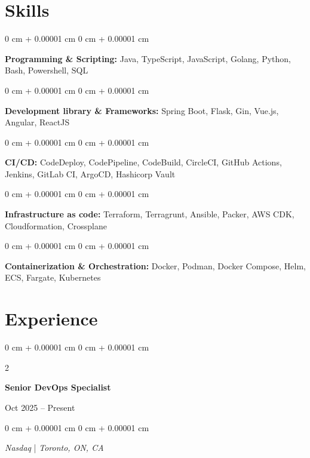 \documentclass[11pt, letterpaper]{article}
\newenvironment{onecolentry}{
\begin{adjustwidth}{
0 cm + 0.00001 cm
}{
0 cm + 0.00001 cm
}
}{
\end{adjustwidth}
} %
\newenvironment{twocolentry}[2][]{
\onecolentry
\def\secondColumn{#2}
\setcolumnwidth{\fill, 4.5 cm}
\begin{paracol}{2}
}{
\switchcolumn \raggedleft \secondColumn
\end{paracol}
\endonecolentry
} %
\begin{document}
\section{Skills}

\begin{onecolentry}
\textbf{Programming \& Scripting:} Java,
TypeScript, JavaScript, Golang, Python, Bash, Powershell, SQL
\end{onecolentry}

\vspace{0.05 cm}
\begin{onecolentry}
\textbf{Development library \& Frameworks:} Spring Boot, Flask, Gin, Vue.js, Angular, ReactJS
\end{onecolentry}

\vspace{0.05 cm}
\begin{onecolentry}
\textbf{CI\//CD:} CodeDeploy, CodePipeline, CodeBuild, CircleCI, GitHub Actions, Jenkins, GitLab CI, ArgoCD, Hashicorp Vault \end{onecolentry}

\vspace{0.05 cm}
\begin{onecolentry}
\textbf{Infrastructure as code:} Terraform, Terragrunt, Ansible, Packer, AWS CDK, Cloudformation, Crossplane \end{onecolentry}

\vspace{0.05 cm}
\begin{onecolentry}
\textbf{Containerization \& Orchestration:} Docker, Podman, Docker Compose, Helm,
ECS, Fargate, Kubernetes
\end{onecolentry}



\section{Experience}

\begin{twocolentry}{
Oct 2025 – Present
}
\textbf{Senior DevOps Specialist}
\end{twocolentry}

\begin{onecolentry}
\textit{Nasdaq} | \textit{Toronto, ON, CA}
\end{onecolentry}
\end{document}
